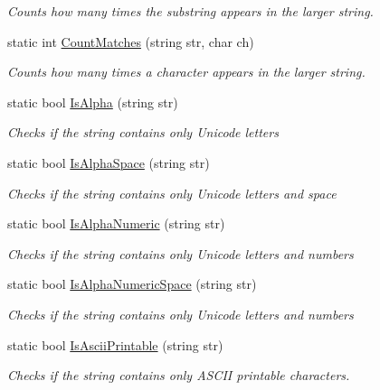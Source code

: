 \begin{DoxyCompactItemize}
\begin{DoxyCompactList}\small\item\em Counts how many times the substring appears in the larger string. \end{DoxyCompactList}\item 
static int \hyperlink{class_ultimate_1_1_utilities_1_1_string_utils_af2c0b935dbb2d1272a684d266359092e}{Count\+Matches} (string str, char ch)
\begin{DoxyCompactList}\small\item\em Counts how many times a character appears in the larger string. \end{DoxyCompactList}\item 
static bool \hyperlink{class_ultimate_1_1_utilities_1_1_string_utils_acf9407768af0a482b9cf33f7c7080989}{Is\+Alpha} (string str)
\begin{DoxyCompactList}\small\item\em Checks if the string contains only Unicode letters \end{DoxyCompactList}\item 
static bool \hyperlink{class_ultimate_1_1_utilities_1_1_string_utils_ae24bd8c6ef99ba1f23e82f6c5abec7ff}{Is\+Alpha\+Space} (string str)
\begin{DoxyCompactList}\small\item\em Checks if the string contains only Unicode letters and space \end{DoxyCompactList}\item 
static bool \hyperlink{class_ultimate_1_1_utilities_1_1_string_utils_afdd361b07f3fd1ac72fd3b4257021102}{Is\+Alpha\+Numeric} (string str)
\begin{DoxyCompactList}\small\item\em Checks if the string contains only Unicode letters and numbers \end{DoxyCompactList}\item 
static bool \hyperlink{class_ultimate_1_1_utilities_1_1_string_utils_af6144ba68c695f583c0bf16d0a1e2faa}{Is\+Alpha\+Numeric\+Space} (string str)
\begin{DoxyCompactList}\small\item\em Checks if the string contains only Unicode letters and numbers \end{DoxyCompactList}\item 
static bool \hyperlink{class_ultimate_1_1_utilities_1_1_string_utils_a78956187acb4a5acb1b66c5622a80cb6}{Is\+Ascii\+Printable} (string str)
\begin{DoxyCompactList}\small\item\em Checks if the string contains only A\+S\+C\+II printable characters. \end{DoxyCompactList}\item 

\end{DoxyCompactItemize}
